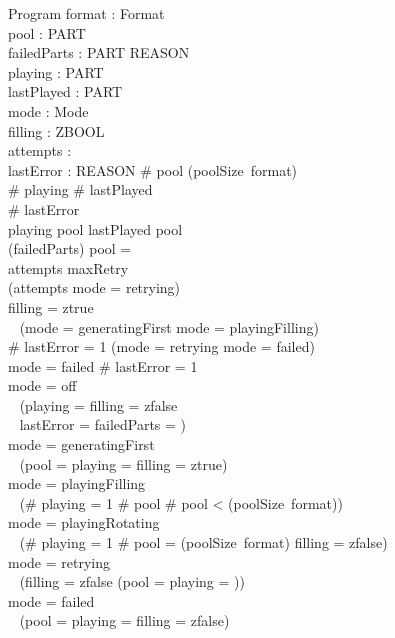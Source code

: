 \documentclass[a4paper,10pt,fleqn]{article}
\begin{document}
\begin{schema}{Program}
  format : Format \\
  pool : \power PART \\
  failedParts : PART \pfun REASON \\
  playing : \power PART \\
  lastPlayed : \power PART \\
  mode : Mode \\
  filling : ZBOOL \\
  attempts : \nat \\
  lastError : \power REASON
  \where
  \# pool \leq (poolSize~format) \\
  \# playing  \land \# lastPlayed  \\
  \# lastError  \\
  playing \subseteq pool \land lastPlayed \subseteq pool \\
  (\dom failedParts) \cap pool = \emptyset \\
  attempts \leq maxRetry \\
  (attempts  \iff mode = retrying) \\
  filling = ztrue \implies \\
  \quad~ (mode = generatingFirst \lor mode = playingFilling) \\
  \# lastError = 1 \implies (mode = retrying \lor mode = failed) \\
  mode = failed \implies \# lastError = 1 \\
  mode = off \implies \\
  \quad~ (playing = \emptyset \land filling = zfalse \\
  \quad~ \land lastError = \emptyset \land failedParts = \emptyset) \\
  mode = generatingFirst \implies \\
  \quad~ (pool = \emptyset \land playing = \emptyset \land filling = ztrue) \\
  mode = playingFilling \implies \\
  \quad~ (\# playing = 1 \land \# pool  \land \# pool < (poolSize~format)) \\
  mode = playingRotating \implies \\
  \quad~ (\# playing = 1 \land \# pool = (poolSize~format) \land filling = zfalse) \\
  mode = retrying \implies \\
  \quad~ (filling = zfalse \land (pool = \emptyset \iff playing = \emptyset)) \\
  mode = failed \implies \\
  \quad~ (pool = \emptyset \land playing = \emptyset \land filling = zfalse)
\end{schema}
\end{document}
